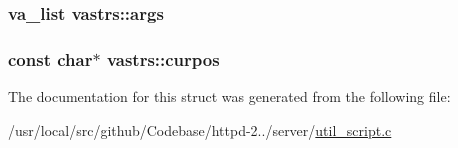 \subsubsection[{\texorpdfstring{args}{args}}]{\setlength{\rightskip}{0pt plus 5cm}va\+\_\+list vastrs\+::args}\hypertarget{structvastrs_a87fb5e99f88cc222085212bf9935e0b3}{}\label{structvastrs_a87fb5e99f88cc222085212bf9935e0b3}
\subsubsection[{\texorpdfstring{curpos}{curpos}}]{\setlength{\rightskip}{0pt plus 5cm}const char$\ast$ vastrs\+::curpos}\hypertarget{structvastrs_a13c8f8d17ed73d659d51dbc49941756c}{}\label{structvastrs_a13c8f8d17ed73d659d51dbc49941756c}


The documentation for this struct was generated from the following file\+:\begin{DoxyCompactItemize}
\item 
/usr/local/src/github/\+Codebase/httpd-\/2../server/\hyperlink{util__script_8c}{util\+\_\+script.\+c}\end{DoxyCompactItemize}
